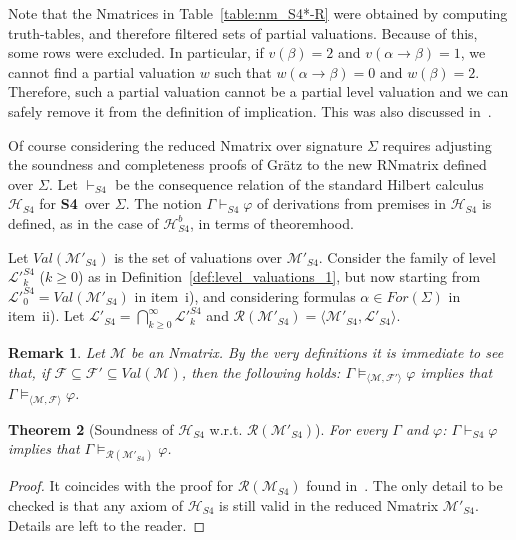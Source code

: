 \documentclass[12pt]{article}
\newtheorem{theorem}{Theorem}[section]
\newtheorem{remark}[theorem]{Remark}
\newcommand{\sfo}{\textbf{S4}}
\begin{document}
Note that the Nmatrices in Table~\ref{table:nm_S4*-R} were obtained by computing truth-tables, and therefore filtered sets of partial valuations. Because of this, some rows were excluded. In particular, if $v(\beta) = 2$ and $v(\alpha \to \beta) = 1$, we cannot find a partial valuation $w$ such that $w(\alpha \to \beta) = 0$ and $w(\beta) = 2$. Therefore, such a partial valuation cannot be a partial level valuation and we can safely remove it from the definition of implication. This was also discussed in~\cite[p. 17]{gratz_truth_2022}.



Of course considering the reduced Nmatrix over signature $\Sigma$ requires adjusting the soundness and completeness proofs of Gr\"atz to the new RNmatrix defined over $\Sigma$. Let $\vdash_{S4}$ be the consequence relation of the standard Hilbert calculus $\mathcal{H}_{S4}$ for \sfo\ over $\Sigma$. The notion $\Gamma \vdash_{S4} \varphi$ of derivations  from premises in  $\mathcal{H}_{S4}$ is defined, as in the case of $\mathcal{H}^b_{S4}$, in terms of theoremhood.


Let  $Val(\mathcal{M}'_{S4})$ is the set of  valuations over $\mathcal{M}'_{S4}$.  Consider the family of level $\mathcal{L}'^{S4}_k$ ($k \geq 0$) as in Definition~\ref{def:level_valuations_1}, but now starting from ${\mathcal{L}'}_0^{S4} = Val(\mathcal{M}'_{S4})$ in item~i), and considering formulas $\alpha \in For(\Sigma)$ in item~ii). Let $\mathcal{L}'_{S4} = \bigcap^\infty_{k \geq 0} \mathcal{L}'^{S4}_k$ and $\mathcal{R}(\mathcal{M}'_{S4}) = \langle \mathcal{M}'_{S4}, \mathcal{L}'_{S4}\rangle$. 

\begin{remark} \label{rem:der:RNmatrices}
Let  $\mathcal{M}$ be an  Nmatrix. By the very definitions it is immediate to see that, if $\mathcal{F} \subseteq \mathcal{F}' \subseteq Val(\mathcal{M})$, then the following holds:  $\Gamma \models_{\langle \mathcal{M},\mathcal{F}'\rangle} \varphi$ implies that  $\Gamma \models_{\langle \mathcal{M},\mathcal{F}\rangle} \varphi$.
\end{remark}

\begin{theorem} [Soundness  of $\mathcal{H}_{S4}$ w.r.t.  $\mathcal{R}(\mathcal{M}'_{S4})$] \label{thm:sound:S4N}
For every $\Gamma$ and $\varphi$: $\Gamma \vdash_{S4} \varphi$ implies that $\Gamma  \models_{\mathcal{R}(\mathcal{M}'_{S4})} \varphi$.
\end{theorem}
\begin{proof} 
It coincides with the proof for $\mathcal{R}(\mathcal{M}_{S4})$ found in~\cite[Theorems~3.4 and~3.5]{gratz_truth_2022}.
The only detail to be checked is that any axiom of  $\mathcal{H}_{S4}$ is still valid in the reduced Nmatrix $\mathcal{M}'_{S4}$. Details are left to the reader.
\end{proof}
\end{document}
